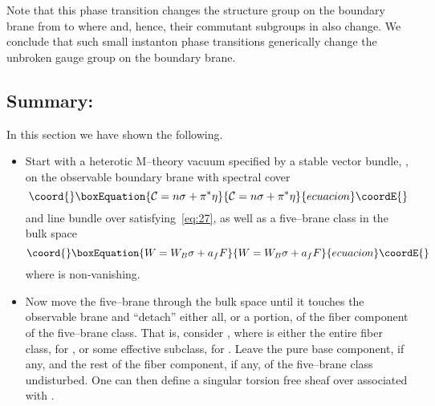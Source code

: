 \documentclass[a4paper,12pt]{article}
\numberwithin{equation}{section}
\def\cC{{\mathcal C}}
\def\cN{{\mathcal N}}
\theoremstyle{plain}
\begin{document}
Note that this phase transition changes the structure group on the boundary
brane from \coordHE{} to \coordHE{}
where \coordHE{} and, hence, their commutant subgroups in \coordHE{} also
change. We conclude that such small instanton phase transitions
generically change the unbroken gauge group on the boundary brane.

\subsection*{Summary:}

In this section we have shown the following.

\begin{itemize}

\item Start with a heterotic M--theory vacuum specified by
a stable \coordHE{} vector bundle, \coordHE{}, on the observable boundary
brane with spectral cover
\begin{equation}\coord{}\boxEquation{
{\cal{C}}= n\sigma+ \pi^{*}\eta
\label{eq:185}
}{
{\cal{C}}= n\sigma+ \pi^{*}\eta
}{ecuacion}\coordE{}\end{equation}
and line bundle \myHighlight{$\cN$}\coordHE{} over \myHighlight{$\cC$}\coordHE{} satisfying~\eqref{eq:27},
as well as a five--brane class in the bulk space 
\begin{equation}\coord{}\boxEquation{
W=W_{B}\sigma +a_{f}F
\label{eq:186}
}{
W=W_{B}\sigma +a_{f}F
}{ecuacion}\coordE{}\end{equation}
where \coordHE{} is non-vanishing. 


\item Now move the five--brane through the bulk space until it touches 
the observable brane and ``detach'' either
all, or a portion, of the fiber component of the five--brane class.
That is, consider \coordHE{}, where \coordHE{} is either the entire fiber class, for
\coordHE{}, or some effective subclass, for \coordHE{}.
Leave the pure base component, \coordHE{} if any, and the rest of the fiber component, 
if any, of the five--brane class undisturbed. One can then define a singular
torsion free sheaf \coordHE{} over \coordHE{} associated with \coordHE{}.



\end{itemize}
\end{document}
